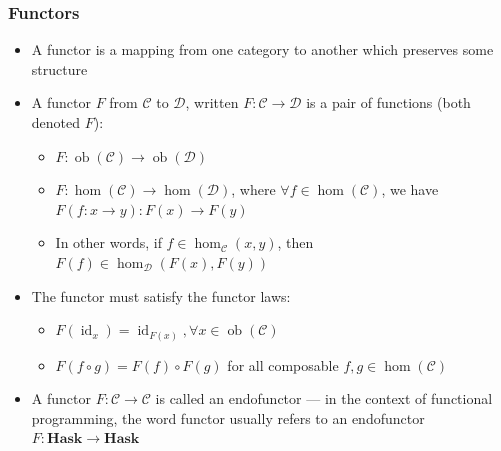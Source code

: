 \documentclass[mathserif,handout]{beamer}
\begin{document}
\begin{frame}[fragile]
  \frametitle{Functors}
  \begin{itemize}
  \item A \alert{functor} is a mapping from one category to another which preserves some structure
  \item A functor $F$ from $\mathcal{C}$ to $\mathcal{D}$, written $F: \mathcal{C}\longrightarrow\mathcal{D}$ is a pair of functions (both denoted $F$):
    \begin{itemize}
    \item $F: \operatorname{ob}(\mathcal{C}) \longrightarrow \operatorname{ob}(\mathcal{D})$
    \item $F: \operatorname{hom}(\mathcal{C})\longrightarrow\operatorname{hom}(\mathcal{D})$, where $\forall f\in\operatorname{hom}(\mathcal{C})$, we have $F(f: x\longrightarrow y): F(x)\longrightarrow F(y)$
      \item In other words, if $f\in\operatorname{hom}_{\mathcal{C}}(x,y)$, then $F(f)\in\operatorname{hom}_{\mathcal{D}}(F(x),F(y))$
    \end{itemize}
  \item The functor must satisfy the \alert{functor laws}:
      \begin{itemize}
      \item $F(\operatorname{id}_x) = \operatorname{id}_{F(x)},\forall x\in\operatorname{ob}(\mathcal{C})$
      \item $F(f\circ g) = F(f)\circ F(g)$ for all composable $f,g\in \operatorname{hom}(\mathcal{C})$
      \end{itemize}
      \item A functor $F:\mathcal{C}\longrightarrow\mathcal{C}$ is called an \alert{endofunctor} --- in the context of functional programming, the word functor usually refers to an endofunctor $F: \textbf{Hask}\longrightarrow\textbf{Hask}$
  \end{itemize}
\end{frame}
\end{document}
